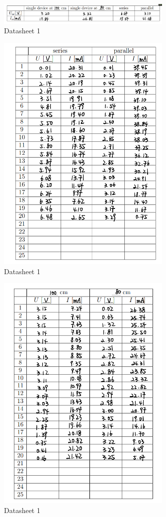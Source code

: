 \documentclass[12pt, a4paper, oneside]{article}
\begin{document}
\begin{figure}[htbp]
	\centering
	\includegraphics[width=0.75\textwidth]{D3.png}
	\caption{Datasheet 1}
\end{figure}

\begin{figure}[htbp]
	\centering
	\includegraphics[width=0.75\textwidth]{D4.png}
	\caption{Datasheet 1}
\end{figure}

\begin{figure}[htbp]
	\centering
	\includegraphics[width=0.75\textwidth]{D5.png}
	\caption{Datasheet 1}
\end{figure}


\end{document}
